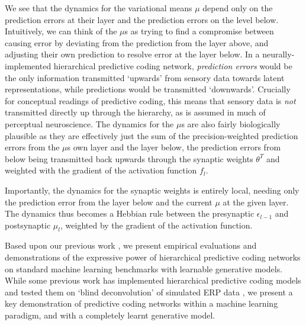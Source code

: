 We see that the dynamics for the variational means $\mu$ depend only on the prediction errors at their layer and the prediction errors on the level below. Intuitively, we can think of the $\mu$s as trying to find a compromise between causing error by deviating from the prediction from the layer above, and adjusting their own prediction to resolve error at the layer below. In a neurally-implemented hierarchical predictive coding network, \emph{prediction errors} would be the only information transmitted `upwards' from sensory data towards latent representations, while predictions would be transmitted `downwards'. Crucially for conceptual readings of predictive coding, this means that sensory data is \emph{not} transmitted directly up through the hierarchy, as is assumed in much of perceptual neuroscience. The dynamics for the $\mu$s are also fairly biologically plausible as they are effectively just the sum of the precision-weighted prediction errors from the $\mu$s own layer and the layer below, the prediction errors from below being transmitted back upwards through the synaptic weights $\theta^T$ and weighted with the gradient of the activation function $f_l$. 

Importantly, the dynamics for the synaptic weights is entirely local, needing only the prediction error from the layer below and the current $\mu$ at the given layer. The dynamics thus becomes a Hebbian rule between the presynaptic $\epsilon_{l-1}$ and postsynaptic $\mu_l$, weighted by the gradient of the activation function.

Based upon our previous work \citep{millidge2019implementing}, we present empirical evaluations and demonstrations of the expressive power of hierarchical predictive coding networks on standard machine learning benchmarks with learnable generative models. While some previous work has implemented hierarchical predictive coding models and tested them on `blind deconvolution' of simulated ERP data \citep{friston2008hierarchical,friston2005theory}, we present a key demonstration of predictive coding networks within a machine learning paradigm, and with a completely learnt generative model.

